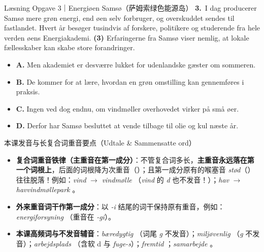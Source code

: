 \begin{emailbox}{Læsning Opgave 3｜Energiøen Samsø（萨姆索绿色能源岛）}
\textbf{3.}\ I dag producerer Samsø mere grøn energi, end øen selv forbruger, og overskuddet sendes til fastlandet. Hvert år besøger tusindvis af forskere, politikere og studerende fra hele verden øens Energiakademi. \textbf{(3) \underline{\hspace{2.8cm}}} Erfaringerne fra Samsø viser nemlig, at lokale fællesskaber kan skabe store forandringer.
\begin{itemize}[label={}]
  \item \textbf{A.} Men akademiet er desværre lukket for udenlandske gæster om sommeren.
  \item \textbf{B.} De kommer for at lære, hvordan en grøn omstilling kan gennemføres i praksis.
  \item \textbf{C.} Ingen ved dog endnu, om vindmøller overhovedet virker på små øer.
  \item \textbf{D.} Derfor har Samsø besluttet at vende tilbage til olie og kul næste år.
\end{itemize}
\end{emailbox}

\begin{tipbox}{本课发音与长复合词重音要点（Udtale \& Sammensatte ord）}
\begin{itemize}
  \item \textbf{复合词重音铁律（主重音在第一成分）}：不管复合词多长，\textbf{主重音永远落在第一个词根上}，后面的词根降为次重音（）；且第一成分原有的喉塞音 \textit{stød}（）往往脱落！例如：\textit{vind}  $\rightarrow$ \textit{vindmølle} （\textit{vind} 的 \textit{d} 也不发音！）；\textit{hav}  $\rightarrow$ \textit{havvindmøllepark} 。
  \item \textbf{外来重音词干作第一成分}：以 \textit{-i} 结尾的词干保持原有重音，例如：\textit{energiforsyning} （重音在 \textit{-gi}）。
  \item \textbf{本课高频词与不发音辅音}：\textit{bæredygtig} （词尾 \textit{g} 不发音）；\textit{miljøvenlig} （\textit{g} 不发音）；\textit{arbejdsplads} （含软 d  与 \textit{fuge-s}）；\textit{fremtid} ；\textit{samarbejde} 。
\end{itemize}
\end{tipbox}

